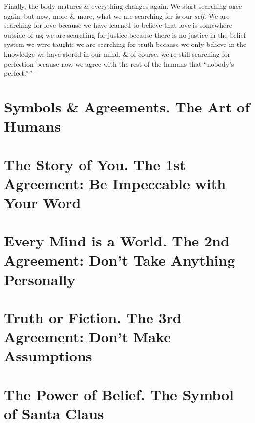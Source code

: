 \documentclass{article}
\numberwithin{equation}{section}
\begin{document}
Finally, the body matures \& everything changes again. We start searching once again, but now, more \& more, what we are searching for is our \textit{self}. We are searching for love because we have learned to believe that love is somewhere outside of us; we are searching for justice because there is no justice in the belief system we were taught; we are searching for truth because we only believe in the knowledge we have stored in our mind. \& of course, we're still searching for perfection because now we agree with the rest of the humans that ``nobody's perfect.'''' -- \cite[pp. 19--24]{Ruiz_Ruiz2011}


\section{Symbols \& Agreements. The Art of Humans}


\section{The Story of You. The 1st Agreement: Be Impeccable with Your Word}


\section{Every Mind is a World. The 2nd Agreement: Don't Take Anything Personally}


\section{Truth or Fiction. The 3rd Agreement: Don't Make Assumptions}


\section{The Power of Belief. The Symbol of Santa Claus}
\end{document}
